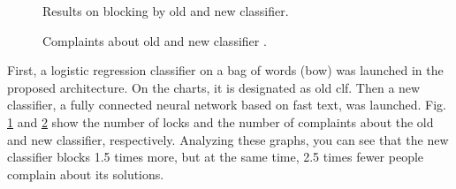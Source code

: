 \documentclass[a4paper]{jpconf}
\begin{document}
\begin{figure}[h!]
	\centering
	\caption{\label{fig:04} Results on blocking by old and new classifier.}
\end{figure}


\begin{figure}[t!]
	\centering
	\caption{\label{fig:05} Complaints about old and new classifier .}
\end{figure}

First, a logistic regression classifier on a bag of words (bow) was launched in the proposed architecture. On the charts, it is designated as old clf. Then a new classifier, a fully connected neural network based on fast text, was launched. Fig. \ref{fig:04} and \ref{fig:05} show the number of locks and the number of complaints about the old and new classifier, respectively. Analyzing these graphs, you can see that the new classifier blocks 1.5 times more, but at the same time, 2.5 times fewer people complain about its solutions.
\end{document}
